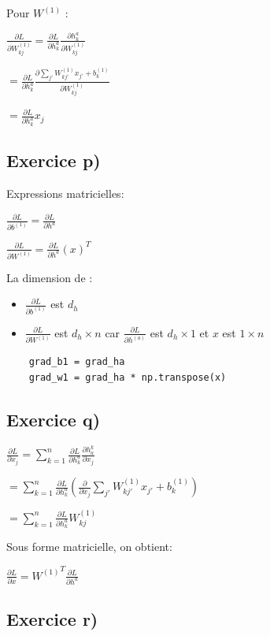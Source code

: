 \documentclass[a4paper,10pt]{article}
\begin{document}
Pour $W^{(1)}$ :

$\frac{\partial L}{\partial W^{(1)}_{kj}} = \frac{\partial L}{\partial h^{a}_{k}} \frac{\partial h^{a}_{k}}{\partial W^{(1)}_{kj}} $

$ = \frac{\partial L}{\partial h^{a}_{k}} \frac{\partial \sum_{j'} W^{(1)}_{kj'} x_{j'} + b^{(1)}_{k}}{\partial W^{(1)}_{kj}}$

$ = \frac{\partial L}{\partial h^{a}_{k}} x_{j} $


\subsection{Exercice p)}

Expressions matricielles:

$\frac{\partial L}{\partial b^{(1)}} = \frac{\partial L}{\partial h^a}$

$\frac{\partial L}{\partial W^{(1)}} = \frac{\partial L}{\partial h^a}(x)^T$

La dimension de :
\begin{itemize}
	\item $\frac{\partial L}{\partial b^{(1)}}$ est $d_{h}$
	\item $\frac{\partial L}{\partial W^{(1)}}$ est $d_{h} \times n$ car  $\frac{\partial L}{\partial h^{(a)}}$ est $d_{h} \times 1$ et $ x $ est $1 \times n$
\end{itemize}

\begin{verbatim}
	grad_b1 = grad_ha
	grad_w1 = grad_ha * np.transpose(x)
\end{verbatim}


\subsection{Exercice q)}

$\frac{\partial L}{\partial x_j} = \sum_{k=1}^{n} \frac{\partial L}{\partial h_k^a} \frac{\partial h_a^k}{\partial x_j}$

$ = \sum_{k=1}^{n} \frac{\partial L}{\partial h_k^a} (\frac{\partial }{\partial x_j} \sum_{j'} W^{(1)}_{kj'} x_{j'} + b^{(1)}_k)$

$ = \sum_{k=1}^{n} \frac{\partial L}{\partial h_k^a} W^{(1)}_{kj}$

Sous forme matricielle, on obtient:

$\frac{\partial L}{\partial x} = {W^{(1)}}^T \frac{\partial L}{\partial h^a}$

\subsection{Exercice r)}
\end{document}
